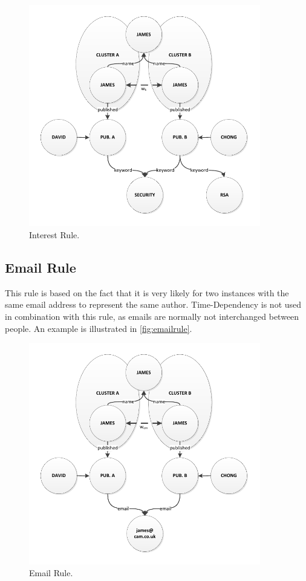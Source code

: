 \begin{figure}[h!]
	\centering
		\includegraphics[width=0.9\textwidth]{fig/interestrule}
	\caption{Interest Rule.}
	\label{fig:interestrule}
\end{figure}


\subsection{Email Rule}

This rule is based on the fact that it is very likely for two instances with the same email address to represent the same author. Time-Dependency is not used in combination with this rule, as emails are normally not interchanged between people. An example is illustrated in \autoref{fig:emailrule}.

\begin{figure}[h!]
	\centering
		\includegraphics[width=0.9\textwidth]{fig/emailrule}
	\caption{Email Rule.}
	\label{fig:emailrule}
\end{figure}

